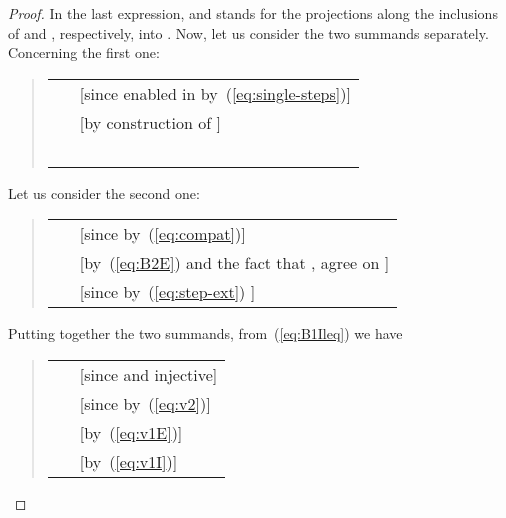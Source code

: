 \documentclass{LMCS}
\begin{document}
\begin{proof}
  In the last expression,  and  stands for the projections along the
  inclusions of  and , respectively, into . Now,
  let us consider the two summands separately. Concerning the first
  one:
  \begin{quote}
    \begin{tabular}{ll}
       &
      [since   enabled in  by~(\ref{eq:single-steps})]\\
\ \quad  & 
      [by construction of ]\\
\ \quad 
    \end{tabular}
  \end{quote}
  Let us consider the second one:
  \begin{quote}
    \begin{tabular}{ll}
      \\
\ \quad  & 
      [since   by~(\ref{eq:compat})]\\
\ \quad  &
      [by~(\ref{eq:B2E}) and the fact that ,  agree on ]\\
\ \quad  &
      [since by~(\ref{eq:step-ext})  ]
    \end{tabular}
  \end{quote}
  Putting together the two summands, from~(\ref{eq:B1Ileq}) we have
  \begin{quote}
    \begin{tabular}{ll}
      \\
\ \quad  &
      [since  and  injective]\\
\ \quad  &
      [since   by~(\ref{eq:v2})]\\
\ \quad  &
      [by~(\ref{eq:v1E})]\\
\ \quad  &
      [by~(\ref{eq:v1I})]
    \end{tabular}
  \end{quote}



\end{proof}
\end{document}
